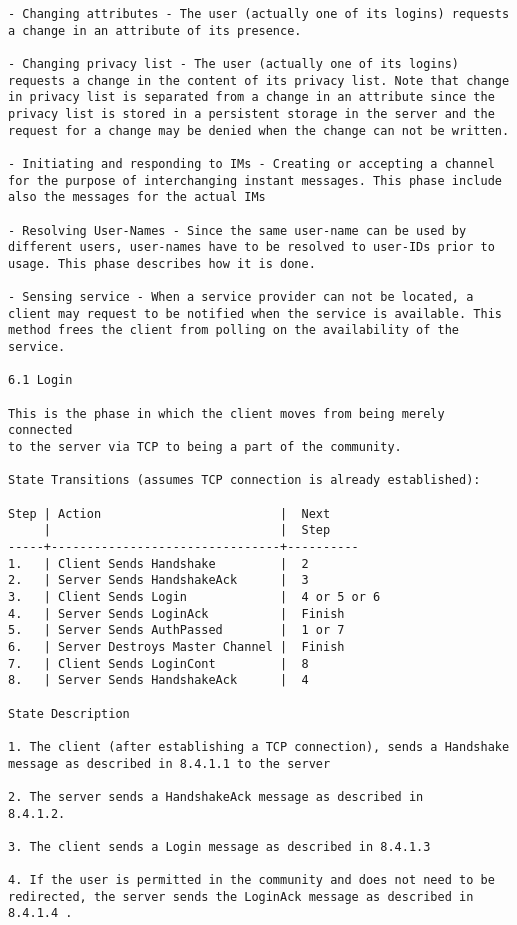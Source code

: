 \documentclass[titlepage,oneside]{book}
\begin{document}
\begin{verbatim}
- Changing attributes - The user (actually one of its logins) requests
a change in an attribute of its presence.

- Changing privacy list - The user (actually one of its logins)
requests a change in the content of its privacy list. Note that change
in privacy list is separated from a change in an attribute since the
privacy list is stored in a persistent storage in the server and the
request for a change may be denied when the change can not be written.

- Initiating and responding to IMs - Creating or accepting a channel
for the purpose of interchanging instant messages. This phase include
also the messages for the actual IMs

- Resolving User-Names - Since the same user-name can be used by
different users, user-names have to be resolved to user-IDs prior to
usage. This phase describes how it is done.

- Sensing service - When a service provider can not be located, a
client may request to be notified when the service is available. This
method frees the client from polling on the availability of the
service.

6.1 Login

This is the phase in which the client moves from being merely connected
to the server via TCP to being a part of the community.

State Transitions (assumes TCP connection is already established):

Step | Action                         |  Next
     |                                |  Step
-----+--------------------------------+----------
1.   | Client Sends Handshake         |  2
2.   | Server Sends HandshakeAck      |  3
3.   | Client Sends Login             |  4 or 5 or 6
4.   | Server Sends LoginAck          |  Finish
5.   | Server Sends AuthPassed        |  1 or 7
6.   | Server Destroys Master Channel |  Finish
7.   | Client Sends LoginCont         |  8
8.   | Server Sends HandshakeAck      |  4

State Description

1. The client (after establishing a TCP connection), sends a Handshake
message as described in 8.4.1.1 to the server

2. The server sends a HandshakeAck message as described in
8.4.1.2.

3. The client sends a Login message as described in 8.4.1.3

4. If the user is permitted in the community and does not need to be
redirected, the server sends the LoginAck message as described in
8.4.1.4 .


\end{verbatim}
\end{document}

